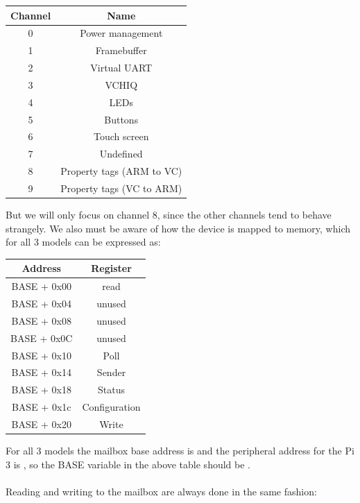 \documentclass[12pt, svgnames]{book}
\begin{document}
\begin{center}
	{
		\begin{tabular}{ |c|c| }
			\hline
			Channel 	&	Name \\
			\hline
			0& Power management\\
			1& Framebuffer\\
			2& Virtual UART\\
			3& VCHIQ\\
			4& LEDs\\
			5& Buttons\\
			6& Touch screen\\
			7& Undefined\\
			8& Property tags (ARM to VC)\\
			9& Property tags (VC to ARM)\\
			\hline
		\end{tabular}
	}
\end{center}

But we will only focus on channel 8, since the other channels tend to behave strangely. We also must be aware of how the device is mapped to memory, which for all 3 models can be expressed as:

\begin{center}
	{
		\begin{tabular}{ |c|c| }
			\hline
			Address 	&	Register \\
			\hline
			BASE + 0x00 & read\\
			BASE + 0x04 & unused\\
			BASE + 0x08 & unused\\
			BASE + 0x0C & unused\\
			BASE + 0x10 & Poll\\
			BASE + 0x14 & Sender\\
			BASE + 0x18 & Status\\
			BASE + 0x1c & Configuration\\
			BASE + 0x20 & Write\\
			\hline
		\end{tabular}
	}
\end{center}

For all 3 models the mailbox base address is  and the peripheral address for the Pi 3 is , so the BASE variable in the above table should be .
\\~\\
Reading and writing to the mailbox are always done in the same fashion:
\end{document}
